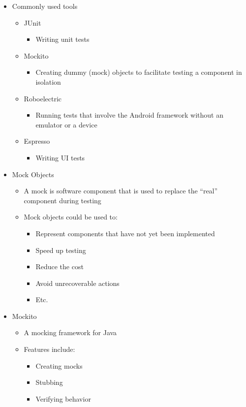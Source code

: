 \documentclass[11pt]{article}
\begin{document}
\begin{itemize}
	\item Commonly used tools
		\begin{itemize}
			\item JUnit
				\begin{itemize}
					\item Writing unit tests
				\end{itemize}
			\item Mockito
				\begin{itemize}
					\item Creating dummy (mock) objects to facilitate testing a component in
					isolation
				\end{itemize}
			\item Roboelectric
				\begin{itemize}
					\item Running tests that involve the Android framework without an emulator or a device
				\end{itemize}
			\item Espresso
				\begin{itemize}
					\item Writing UI tests
				\end{itemize}
		\end{itemize}

	\item Mock Objects
		\begin{itemize}
			\item A mock is software component that is used to replace the “real” component during testing
			\item Mock objects could be used to:
				\begin{itemize}
					\item Represent components that have not yet been implemented
					\item Speed up testing
					\item Reduce the cost
					\item Avoid unrecoverable actions
					\item Etc.
				\end{itemize}
		\end{itemize}

	\item Mockito
		\begin{itemize}
			\item A mocking framework for Java
			\item Features include:
				\begin{itemize}
					\item Creating mocks
					\item Stubbing
					\item Verifying behavior
				\end{itemize}
		\end{itemize}
\end{itemize}
\end{document}
